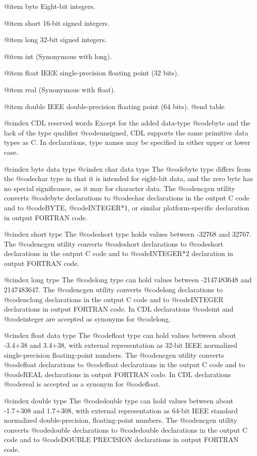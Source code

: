 {@item byte
Eight-bit integers.

@item short
16-bit signed integers.

@item long
32-bit signed integers.

@item int
(Synonymous with long).

@item float
IEEE single-precision floating point (32 bits).

@item real
(Synonymous with float).

@item double
IEEE double-precision floating point (64 bits).
@end table

@cindex CDL reserved words
Except for the added data-type @code{byte} and the lack of the type
qualifier @code{unsigned}, CDL supports the same primitive data types as
C.  In declarations, type names may be specified in either upper or
lower case.

@cindex byte data type
@cindex char data type
The @code{byte} type differs from the @code{char} type in that it is
intended for
eight-bit data, and the zero byte has no special significance, as it
may for character data.  The @code{ncgen} utility converts @code{byte} declarations
to @code{char} declarations in the output C code and to
@code{BYTE}, @code{INTEGER*1}, or similar platform-specific declaration in
output FORTRAN code.

@cindex short type
The @code{short} type holds values between -32768 and 32767.  The @code{ncgen} utility converts
@code{short} declarations to @code{short} declarations in the output
C code and to @code{INTEGER*2} declaration in output
FORTRAN code.

@cindex long type
The @code{long} type can hold values between -2147483648 and 2147483647.
The @code{ncgen} utility converts @code{long} declarations to @code{nclong}
declarations in the output C code and to @code{INTEGER} declarations in
output FORTRAN code.  In CDL declarations @code{int} and @code{integer}
are accepted as synonyms for @code{long}.

@cindex float data type
The @code{float} type can hold values between about -3.4+38 and 3.4+38,
with external representation as 32-bit IEEE normalized
single-precision floating-point numbers.  The @code{ncgen} utility converts
@code{float} declarations to @code{float} declarations in the output C
code and to @code{REAL} declarations in output FORTRAN code.
In CDL declarations @code{real} is accepted as a synonym for @code{float}.

@cindex double type
The @code{double} type can hold values between about -1.7+308 and 1.7+308,
with external representation as 64-bit IEEE standard
normalized double-precision, floating-point numbers.  The @code{ncgen} utility
converts @code{double} declarations to @code{double} declarations in the
output C code and to @code{DOUBLE PRECISION} declarations in output
FORTRAN code.

}
